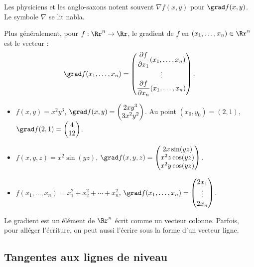 \documentclass[11pt,class=report,crop=false]{standalone}
\begin{document}
Les physiciens et les anglo-saxons notent souvent $\nabla f (x,y)$ pour $\grad f (x,y)$. Le symbole $\nabla$ se lit \og{}nabla\fg{}.


Plus généralement, pour $f : \Rr^n \to \Rr$, le gradient de $f$ en $(x_1,\ldots,x_n) \in \Rr^n$ est le vecteur :
$$\grad f (x_1,\ldots,x_n) =
\begin{pmatrix} \dfrac{\partial f}{\partial x_{1}} (x_1,\ldots,x_n)\\ \vdots \\ \dfrac{\partial f}{\partial x_n}(x_1,\ldots,x_n)\end{pmatrix}.$$



\begin{exemple}
\sauteligne
\begin{itemize}
\item $f(x,y) = x^2y^3$, $\grad f (x,y) =  \begin{pmatrix}2xy^3\\3x^2y^2\end{pmatrix}$. Au point $(x_0,y_0)=(2,1)$, $\grad f (2,1) =  \begin{pmatrix}4\\12\end{pmatrix}$.

\item $f(x,y,z) = x^2\sin(yz)$, $\grad f (x,y,z) = \begin{pmatrix} 2x\sin(yz) \\ x^2z \cos(yz) \\ x^2y\cos(yz) \end{pmatrix}$.

\item $f(x_1,\ldots,x_n)= x_1^2+x_2^2+\cdots + x_n^2$, $\grad f (x_1,\ldots,x_n) =  \begin{pmatrix}2x_1\\ \vdots \\2x_n\end{pmatrix}$.
\end{itemize}
\end{exemple}

\begin{remarque*}
Le gradient est un élément de $\Rr^n$ écrit comme un vecteur colonne. Parfois, pour alléger l'écriture, on peut aussi l'écrire sous la forme d'un vecteur ligne.
\end{remarque*}

\subsection{Tangentes aux lignes de niveau}
\end{document}
